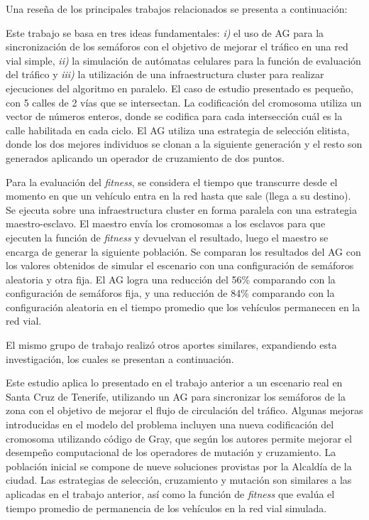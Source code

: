 Una reseña de los principales trabajos relacionados se presenta a continuación:


\begin{itemize}
\begin{item}
Este trabajo se basa en tres ideas fundamentales:  \textit{i)} el uso de AG para la sincronización de los semáforos con el objetivo de mejorar el tráfico en una red vial simple,  \textit{ii)} la simulación de autómatas celulares para la función de evaluación del tráfico y \textit{iii)} la utilización de una infraestructura cluster para realizar ejecuciones del algoritmo en paralelo.
El caso de estudio presentado es pequeño, con 5 calles de 2 vías que se intersectan. La codificación del cromosoma utiliza un vector de números enteros, donde se codifica para cada intersección cuál es la calle habilitada en cada ciclo. El AG utiliza una estrategia de selección elitista, donde los dos mejores individuos se clonan a la siguiente generación y el resto son generados aplicando un operador de cruzamiento de dos puntos.

Para la evaluación del \emph{fitness}, se considera el tiempo que transcurre desde el momento en que un vehículo entra en la red hasta que sale (llega a su destino). Se ejecuta sobre una infraestructura cluster en forma paralela con una estrategia maestro-esclavo. El maestro envía los cromosomas a los esclavos para que ejecuten la función de \emph{fitness} y devuelvan el resultado, luego el maestro se encarga de generar la siguiente población.
Se comparan los resultados del AG con los valores obtenidos de simular el escenario con una configuración de semáforos aleatoria y otra fija. El AG logra una reducción del 56\% comparando con la configuración de semáforos fija, y una reducción de 84\% comparando con la configuración aleatoria en el tiempo promedio que los vehículos permanecen en la red vial. 
	
El mismo grupo de trabajo realizó otros aportes similares, expandiendo esta investigación, los cuales se presentan a continuación.
\end{item}
	
\begin{item}

Este estudio aplica lo presentado en el trabajo anterior a un escenario real en Santa Cruz de Tenerife, utilizando un AG para sincronizar los semáforos de la zona con el objetivo de mejorar el flujo de circulación del tráfico. Algunas mejoras introducidas en el modelo del problema incluyen una nueva codificación del cromosoma utilizando código de Gray, que según los autores permite mejorar el desempeño computacional de los operadores de mutación y cruzamiento. La población inicial se compone de nueve soluciones provistas por la Alcaldía de la ciudad. Las estrategias de selección, cruzamiento y mutación son similares a las aplicadas en el trabajo anterior, así como la función de \emph{fitness} que evalúa el tiempo promedio de permanencia de los vehículos en la red vial simulada.


\end{item}
\end{itemize}
